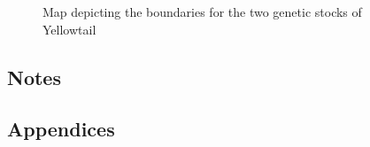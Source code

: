 \documentclass[
]{scrartcl}
\begin{document}
\begin{figure}


\caption{\label{fig-assessregionmap}Map depicting the boundaries for the
two genetic stocks of Yellowtail}

\end{figure}%

\newpage{}

\subsection{Notes}\label{notes}

\newpage{}

\subsection{Appendices}\label{sec-appendix}
\end{document}
